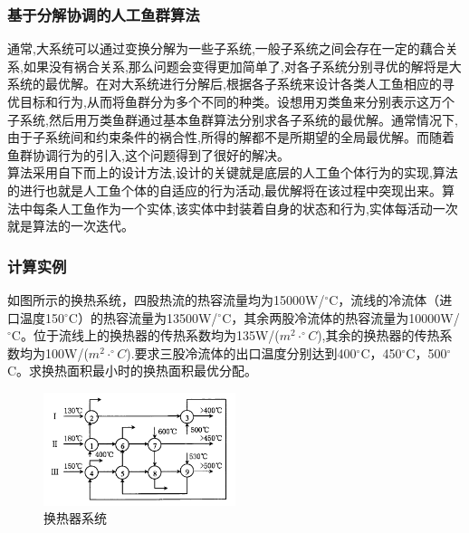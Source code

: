 \begin{frame}
\frametitle{基于分解协调的人工鱼群算法}
通常,大系统可以通过变换分解为一些子系统,一般子系统之间会存在一定的藕合关系,如果没有祸合关系,那么问题会变得更加简单了,对各子系统分别寻优的解将是大系统的最优解。在对大系统进行分解后,根据各子系统来设计各类人工鱼相应的寻优目标和行为,从而将鱼群分为多个不同的种类。设想用刃类鱼来分别表示这万个子系统,然后用万类鱼群通过基本鱼群算法分别求各子系统的最优解。通常情况下,由于子系统间和约束条件的祸合性,所得的解都不是所期望的全局最优解。而随着鱼群协调行为的引入,这个问题得到了很好的解决。\\
算法采用自下而上的设计方法,设计的关键就是底层的人工鱼个体行为的实现,算法的进行也就是人工鱼个体的自适应的行为活动,最优解将在该过程中突现出来。算法中每条人工鱼作为一个实体,该实体中封装着自身的状态和行为,实体每活动一次就是算法的一次迭代。
\end{frame}

\begin{frame}
\frametitle{计算实例}
如图所示的换热系统，四股热流的热容流量均为15000W/$^{\circ}$C，流线\uppercase\expandafter{}的冷流体（进口温度150$^{\circ}$C）的热容流量为13500W/$^{\circ}$C，其余两股冷流体的热容流量为10000W/$^{\circ}$C。位于流线\uppercase\expandafter{}上的换热器的传热系数均为135W/($m^2\cdot ^{\circ}C $),其余的换热器的传热系数均为100W/($m^2\cdot ^{\circ}C $).要求三股冷流体的出口温度分别达到400$^{\circ}$C，450$^{\circ}$C，500$^{\circ}$C。求换热面积最小时的换热面积最优分配。
\begin{figure}[H]
\centering
\includegraphics[width=0.5\textwidth]{pic/fish15.png}
\caption{换热器系统}
\end{figure}
\end{frame}

